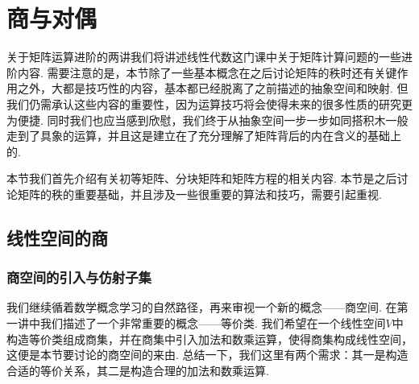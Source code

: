 \chapter{商与对偶}

关于矩阵运算进阶的两讲我们将讲述线性代数这门课中关于矩阵计算问题的一些进阶内容. 需要注意的是，本节除了一些基本概念在之后讨论矩阵的秩时还有关键作用之外，大都是技巧性的内容，基本都已经脱离了之前描述的抽象空间和映射. 但我们仍需承认这些内容的重要性，因为运算技巧将会使得未来的很多性质的研究更为便捷. 同时我们也应当感到欣慰，我们终于从抽象空间一步一步如同搭积木一般走到了具象的运算，并且这是建立在了充分理解了矩阵背后的内在含义的基础上的.

本节我们首先介绍有关初等矩阵、分块矩阵和矩阵方程的相关内容. 本节是之后讨论矩阵的秩的重要基础，并且涉及一些很重要的算法和技巧，需要引起重视.

\section{线性空间的商}

\subsection{商空间的引入与仿射子集}

我们继续循着数学概念学习的自然路径，再来审视一个新的概念——商空间. 在第一讲中我们描述了一个非常重要的概念——等价类. 我们希望在一个线性空间$V$中构造等价类组成商集，并在商集中引入加法和数乘运算，使得商集构成线性空间，这便是本节要讨论的商空间的来由. 总结一下，我们这里有两个需求：其一是构造合适的等价关系，其二是构造合理的加法和数乘运算.

